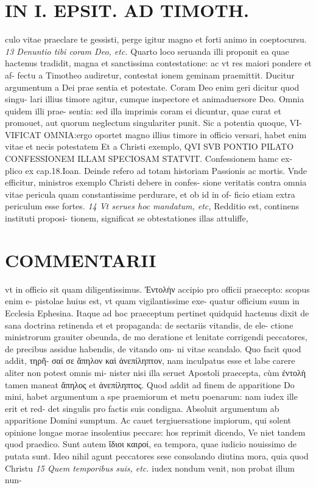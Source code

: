 \documentclass{article}
\begin{document}
\begin{pages}
\section*{IN I. EPSIT. AD TIMOTH. }
\marginpar{[ p.163 ]}\pstart culo vitae praeclare te gessisti, perge igitur magno et forti animo in coeptocursu.  \pend
\textit{13 Denuntio tibi coram Deo, etc. }\pstart Quarto loco seruanda illi proponit ea quae hactenus tradidit, magna et sanctissima contestatione: ac vt res maiori pondere et af- fectu a Timotheo audiretur, contestat ionem geminam praemittit. Ducitur argumentum a Dei prae sentia et potestate.  \pend\pstart Coram Deo enim geri dicitur quod singu- lari illius timore agitur, cumque inspectore et animaduersore Deo. Omnia quidem illi prae- sentia: sed illa imprimis coram ei dicuntur, quae curat et promouet, aut quorum neglectum singulariter punit. Sic a potentia quoque, VI- VIFICAT OMNIA:ergo oportet magno illius timore in officio versari, habet enim vitae et necis potestatem Et a Christi exemplo, QVI SVB PONTIO PILATO CONFESSIONEM ILLAM SPECIOSAM STATVIT. Confessionem hamc ex- plico ex cap.18.Ioan. Deinde refero ad totam historiam Passionis ac mortis. Vnde efficitur, ministros exemplo Christi debere in confes- sione veritatis contra omnia vitae pericula quam constantissime perdurare, et ob id in of- ficio etiam extra periculum esse fortes.  \pend
\textit{14 Vt serues hoc mandatum, etc, }\pstart Redditio est, continens instituti proposi- tionem, significat se obtestationes illas attuliffe,  \pend
\marginpar{[ p.164 ]}
\section*{COMMENTARII }\pstart vt in officio sit quam diligentissimus. Ἐντολὴν accipio pro officii praecepto: scopus enim e- pistolae huius est, vt quam vigilantissime exe- quatur officium suum in Ecclesia Ephesina. Itaque ad hoc praeceptum pertinet quidquid hactenus dixit de sana doctrina retinenda et et propaganda: de sectariis vitandis, de ele- ctione ministrorum grauiter obeunda, de mo deratione et lenitate corrigendi peccatores, de precibus assidue habendis, de vitando om- ni vitae scandalo. Quo facit quod addit, τηρῆ- σαί σε ἄπηλον καὶ ἀνεπίληπτον, nam inculpatus esse et labe carere aliter non potest omnis mi- nister nisi illa seruet Apostoli praecepta, cùm ἐντολὴ tamen maneat ἄπηλος et ἀνεπίληπτος. Quod addit ad finem de apparitione Do mini, habet argumentum a spe praemiorum et metu poenarum: nam iudex ille erit et red- det singulis pro factis suis condigna. Absoluit argumentum ab apparitione Domini sumptum. Ac cauet tergiuersatione impiorum, qui solent opinione longae morae insolentius peccare: hos reprimit dicendo, Ve niet tandem quod praedico. Sunt autem ἵδιοι καιροί, ea tempora, quae iudicio nouissimo de putata sunt. Ideo nihil agunt peccatores sese consolando diutina mora, quia quod Christu  \pend
\textit{15 Quem temporibus suis, etc. }\pstart iudex nondum venit, non probat illum nun-  \pend

\end{pages}
\end{document}
